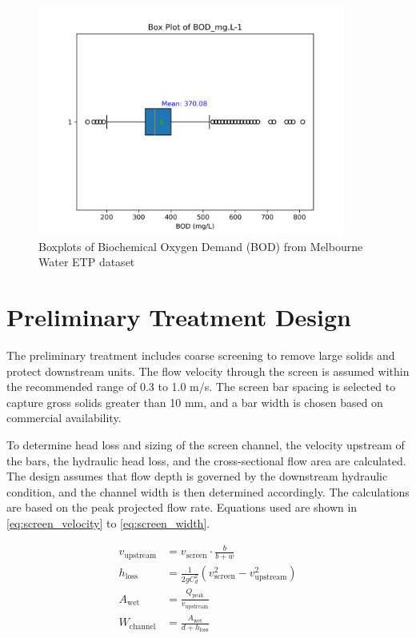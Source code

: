 \documentclass[12pt]{article}
\begin{document}
\begin{figure}[h]
  \centering
  \includegraphics[width=0.9\textwidth]{../images/boxPlot_BOD.png}
  \caption{Boxplots of Biochemical Oxygen Demand (BOD) from Melbourne Water ETP dataset}
  \label{fig:boxplots_quality}
\end{figure}

\section{Preliminary Treatment Design}
\label{sec:prelim_treatment}

The preliminary treatment includes coarse screening to remove large solids and protect downstream units.
The flow velocity through the screen is assumed within the recommended range of 0.3 to 1.0 m/s.
The screen bar spacing is selected to capture gross solids greater than 10 mm, and a bar width is
chosen based on commercial availability.

To determine head loss and sizing of the screen channel, the velocity upstream of the bars, 
the hydraulic head loss, and the cross-sectional flow area are calculated. The design assumes 
that flow depth is governed by the downstream hydraulic condition, and the channel width is then determined accordingly. 
The calculations are based on the peak projected flow rate. Equations used are shown in \eqref{eq:screen_velocity} to 
\eqref{eq:screen_width}.

\begin{align}
v_{\text{upstream}} &= v_{\text{screen}} \cdot \frac{b}{b + w} \label{eq:screen_velocity} \\
h_{\text{loss}} &= \frac{1}{2g C_d^2} \left( v_{\text{screen}}^2 - v_{\text{upstream}}^2 \right) \label{eq:screen_headloss} \\
A_{\text{wet}} &= \frac{Q_{\text{peak}}}{v_{\text{upstream}}} \label{eq:screen_area} \\
W_{\text{channel}} &= \frac{A_{\text{wet}}}{d + h_{\text{loss}}} \label{eq:screen_width}
\end{align}
\end{document}

